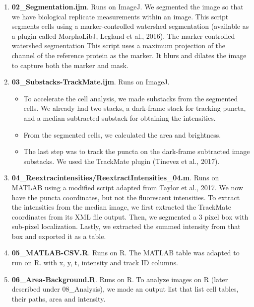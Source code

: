 \begin{enumerate}
\item \textbf{02\_Segmentation.ijm}. Runs on ImageJ. We segmented the image so that we have biological replicate measurements within an image. This script segments cells using a marker-controlled watershed segmentation (available as a plugin called MorphoLibJ, Legland et al., 2016). The marker controlled watershed segmentation 
This script uses a maximum projection of the channel of the reference protein as the marker. It blurs and dilates the image to capture both the marker and mask.

\item \textbf{03\_Substacks-TrackMate.ijm}. Runs on ImageJ. 

\begin{itemize}

\item To accelerate the cell analysis, we made substacks from the segmented cells. We already had two stacks, a dark-frame stack for tracking puncta, and a median subtracted substack for obtaining the intensities.

\item From the segmented cells, we calculated the area and brightness.

\item The last step was to track the puncta on the dark-frame subtracted image substacks. We used the TrackMate plugin (Tinevez et al., 2017).

\end{itemize}

\item \textbf{04\_Reextracintensities/ReextractIntensities\_04.m}. Runs on MATLAB using a modified script adapted from Taylor et al., 2017. We now have the puncta coordinates, but not the fluorescent intensities. To extract the intensities from the median image, we first extracted the TrackMate coordinates from its XML file output. Then, we segmented a 3 pixel box with sub-pixel localization. Lastly, we extracted the summed intensity from that box and exported it as a table.

\item \textbf{05\_MATLAB-CSV.R}. Runs on R. The MATLAB table was adapted to run on R. with x, y, t, intensity and track ID columns.

\item \textbf{06\_Area-Background.R}. Runs on R. To analyze images on R (later described under 08\_Analysis), we made an output list that list cell tables, their paths, area and intensity.


\end{enumerate}
